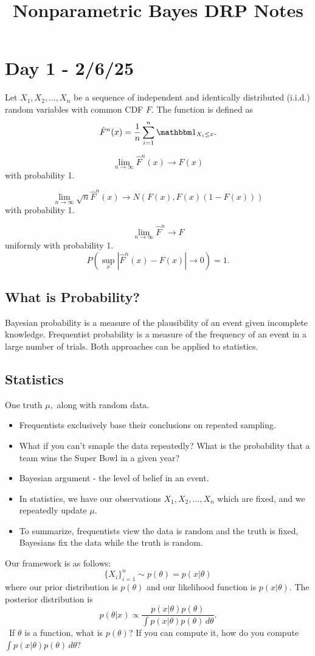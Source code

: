 \documentclass{chaistyle}
\title{Nonparametric Bayes DRP Notes}
\begin{document}
\maketitle
\section*{Day 1 - 2/6/25}
\begin{definition*}
    Let \(X_1, X_2, \dots, X_n\) be a sequence of independent and identically distributed (i.i.d.) random variables with common CDF \(F\). The  function is defined as \[\hat F^n(x)=\frac{1}{n} \sum_{i=1}^n\indic_{X_i\leq x}.\]
\end{definition*}
\begin{theorem*}
    \[\lim_{n \to \infty} \hat F^n(x)\to F(x)\] with probability 1.
\end{theorem*}
\begin{theorem*}
    \[\lim_{n \to \infty} \sqrt n \hat F^n(x)\to N(F(x),F(x)(1-F(x)))\] with probability 1.
\end{theorem*}
\begin{theorem*}
    \[\lim_{n \to \infty} \hat F^n\to F\] uniformly with probability 1. \[P(\sup_x|\hat F^n(x)-F(x)|\to 0)=1.\]
\end{theorem*}
\subsection*{What is Probability?}
Bayesian probability is a measure of the plausibility of an event given incomplete knowledge. Frequentist probability is a measure of the frequency of an event in a large number of trials. Both approaches can be applied to statistics.
\subsection*{Statistics}
One truth \(\mu,\) along with random data.
\begin{itemize}[-]
    \item Frequentists exclusively base their conclusions on repeated sampling.
    \item What if you can't smaple the data repeatedly? What is the probability that a team wins the Super Bowl in a given year?
    \item Bayesian argument - the level of belief in an event.
    \item In statistics, we have our observations \(X_1, X_2, \dots, X_n\) which are fixed, and we repeatedly update \(\mu.\)
    \item To summarize, frequentists view the data is random and the truth is fixed, Bayesians fix the data while the truth is random.
\end{itemize}
Our framework is as follows:
\[\{X_i\}_{i=1}^n\sim p(\theta)=p(x|\theta)\] where our prior distribution is \(p(\theta)\) and our likelihood function is \(p(x|\theta).\) The posterior distribution is \[p(\theta|x)\propto \frac{p(x|\theta)p(\theta)}{\int p(x|\theta)p(\theta)\,d\theta}.\]
\
If \(\theta\) is a function, what is \(p(\theta)\)? If you can compute it, how do you compute \(\int p(x|\theta)p(\theta)\,d\theta\)?
\end{document}
